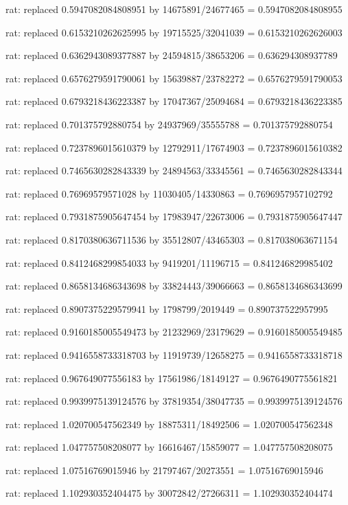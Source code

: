 \documentclass[a4paper,10pt]{article}
\begin{document}
\begin{eulernotebook}
\begin{eulercomment}
\begin{eulercomment}
\begin{eulercomment}
\begin{eulercomment}
\begin{eulercomment}
\begin{eulercomment}
\begin{eulercomment}
\begin{eulercomment}
\begin{eulercomment}
\begin{eulercomment}
\begin{eulercomment}
\begin{eulercomment}
\begin{eulercomment}
\begin{eulercomment}
\begin{eulercomment}
\begin{eulercomment}
\begin{euleroutput}
  rat: replaced 0.5947082084808951 by 14675891/24677465 = 0.5947082084808955
  
  rat: replaced 0.6153210262625995 by 19715525/32041039 = 0.6153210262626003
  
  rat: replaced 0.6362943089377887 by 24594815/38653206 = 0.636294308937789
  
  rat: replaced 0.6576279591790061 by 15639887/23782272 = 0.6576279591790053
  
  rat: replaced 0.6793218436223387 by 17047367/25094684 = 0.6793218436223385
  
  rat: replaced 0.701375792880754 by 24937969/35555788 = 0.701375792880754
  
  rat: replaced 0.7237896015610379 by 12792911/17674903 = 0.7237896015610382
  
  rat: replaced 0.7465630282843339 by 24894563/33345561 = 0.7465630282843344
  
  rat: replaced 0.76969579571028 by 11030405/14330863 = 0.7696957957102792
  
  rat: replaced 0.7931875905647454 by 17983947/22673006 = 0.7931875905647447
  
  rat: replaced 0.8170380636711536 by 35512807/43465303 = 0.817038063671154
  
  rat: replaced 0.8412468299854033 by 9419201/11196715 = 0.841246829985402
  
  rat: replaced 0.8658134686343698 by 33824443/39066663 = 0.8658134686343699
  
  rat: replaced 0.8907375229579941 by 1798799/2019449 = 0.890737522957995
  
  rat: replaced 0.9160185005549473 by 21232969/23179629 = 0.9160185005549485
  
  rat: replaced 0.9416558733318703 by 11919739/12658275 = 0.9416558733318718
  
  rat: replaced 0.967649077556183 by 17561986/18149127 = 0.9676490775561821
  
  rat: replaced 0.9939975139124576 by 37819354/38047735 = 0.9939975139124576
  
  rat: replaced 1.020700547562349 by 18875311/18492506 = 1.020700547562348
  
  rat: replaced 1.047757508208077 by 16616467/15859077 = 1.047757508208075
  
  rat: replaced 1.07516769015946 by 21797467/20273551 = 1.07516769015946
  
  rat: replaced 1.102930352404475 by 30072842/27266311 = 1.102930352404474
  

\end{euleroutput}
\end{eulercomment}
\end{eulercomment}
\end{eulercomment}
\end{eulercomment}
\end{eulercomment}
\end{eulercomment}
\end{eulercomment}
\end{eulercomment}
\end{eulercomment}
\end{eulercomment}
\end{eulercomment}
\end{eulercomment}
\end{eulercomment}
\end{eulercomment}
\end{eulercomment}
\end{eulercomment}
\end{eulernotebook}
\end{document}
